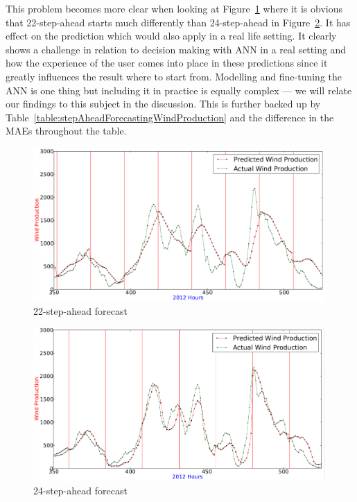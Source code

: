 This problem becomes more clear when looking at Figure~\ref{fig:best22vsbest24Ahead} where it is obvious that 22-step-ahead starts much differently than 24-step-ahead in Figure~\ref{fig:best24AheadPredictionWithLines}. It has effect on the prediction which would also apply in a real life setting. It clearly shows a challenge in relation to decision making with ANN in a real setting and how the experience of the user comes into place in these predictions since it greatly influences the result where to start from. Modelling and fine-tuning the ANN is one thing but including it in practice is equally complex --- we will relate our findings to this subject in the discussion. This is further backed up by Table~\ref{table:stepAheadForecastingWindProduction} and the difference in the MAEs throughout the table.

\begin{figure}[h!]
\centering
\includegraphics[width=0.99\textwidth]{billeder/best22vsbest24Ahead.png}
\caption{22-step-ahead forecast}
\label{fig:best22vsbest24Ahead}
\end{figure}

\begin{figure}[h!]
\centering
\includegraphics[width=0.99\textwidth]{billeder/best24AheadPredictionWithLines.png}
\caption{24-step-ahead forecast}
\label{fig:best24AheadPredictionWithLines}
\end{figure} 


